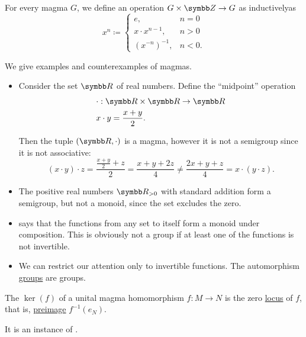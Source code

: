 \begin{definition}\label{def:magma_exponentiation}
  For every magma \( G \), we define an operation \( G \times \BZ \to G \) as inductively\IND as
  \begin{equation*}
    x^n \coloneqq \begin{cases}
      e, &n = 0 \\
      x \cdot x^{n-1}, &n > 0 \\
      (x^{-n})^{-1}, &n < 0.
    \end{cases}
  \end{equation*}
\end{definition}

\begin{example}\label{ex:magmas}
  We give examples and counterexamples of magmas.

  \begin{itemize}
    \item Consider the set \( \BR \) of real numbers. Define the \enquote{midpoint} operation
    \begin{align*}
      &\cdot: \BR \times \BR \to \BR \\
      &x \cdot y = \frac {x + y} 2.
    \end{align*}

    Then the tuple \( (\BR, \cdot) \) is a magma, however it is not a semigroup since it is not associative:
    \begin{equation*}
      (x \cdot y) \cdot z = \frac {{\frac {x + y} 2} + z} 2 = \frac {x + y + 2z} 4
      \neq
      \frac {2x + y + z} 4 = x \cdot (y \cdot z).
    \end{equation*}

    \item The positive real numbers \( \BR_{>0} \) with standard addition form a semigroup, but not a monoid, since the set excludes the zero.

    \item {} says that the functions from any set to itself form a monoid under composition. This is obviously not a group if at least one of the functions is not invertible.

    \item We can restrict our attention only to invertible functions. The automorphism \hyperref[def:automorphism_group]{groups} are groups.
  \end{itemize}
\end{example}

\begin{definition}\label{def:unital_magma_kernel}
  The  \( \ker(f) \) of a unital magma homomorphism \( f: M \to N \) is the zero \hyperref[def:zero_locus]{locus} of \( f \), that is, \hyperref[def:function/preimage]{preimage} \( f^{-1}(e_N) \).

  It is an instance of .
\end{definition}

